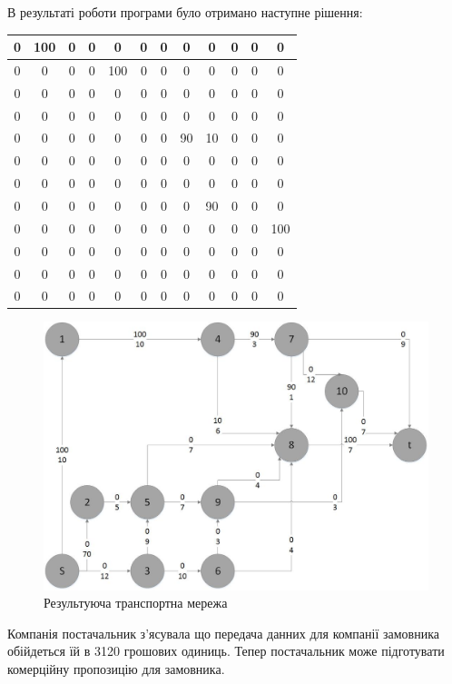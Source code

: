 \documentclass[a4paper,14pt,russian,ukrainian,oneside,final]{extreport}
\begin{document}
\indent В результаті роботи програми було отримано наступне рішення:
\begin{center}
\begin{tabular}{|c|c|c|c|c|c|c|c|c|c|c|c|}
\hline
0&100&0&0&0&0&0&0&0&0&0&0 \\ \hline
0&0&0&0&100&0&0&0&0&0&0&0 \\ \hline
0&0&0&0&0&0&0&0&0&0&0&0   \\ \hline
0&0&0&0&0&0&0&0&0&0&0&0   \\ \hline
0&0&0&0&0&0&0&90&10&0&0&0 \\ \hline
0&0&0&0&0&0&0&0&0&0&0&0   \\ \hline
0&0&0&0&0&0&0&0&0&0&0&0   \\ \hline
0&0&0&0&0&0&0&0&90&0&0&0  \\ \hline
0&0&0&0&0&0&0&0&0&0&0&100 \\ \hline
0&0&0&0&0&0&0&0&0&0&0&0   \\ \hline
0&0&0&0&0&0&0&0&0&0&0&0   \\ \hline
0&0&0&0&0&0&0&0&0&0&0&0   \\ \hline
\end{tabular}
\begin{figure}[h]
\begin{center}
\includegraphics[scale=0.60]{G2_1.jpg}
\caption{Результуюча транспортна мережа}
\end{center}
\end{figure}
\end{center}
Компанія постачальник з'ясувала що передача данних для компанії замовника обійдеться їй в 3120 грошових одиниць.
Тепер постачальник може підготувати комерційну пропозицію для замовника.
\end{document}

